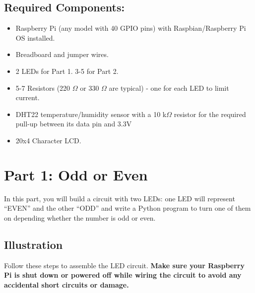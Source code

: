 \documentclass[a4paper,11pt]{article}
\begin{document}
\subsection*{Required Components:}
\begin{itemize}
    \item Raspberry Pi (any model with 40 GPIO pins) with Raspbian/Raspberry Pi OS installed. 
\item Breadboard and jumper wires.
\item 2 LEDs for Part 1. 3-5 for Part 2.
\item 5-7 Resistors (220 $\Omega$ or 330 $\Omega$ are typical) - one for each LED to limit current. 
\item DHT22 temperature/humidity sensor with a 10 k$\Omega$ resistor for the required pull-up between its data pin and 3.3V
\item 20x4 Character LCD.
\end{itemize}


\newpage
\section*{Part 1: Odd or Even}
In this part, you will build a circuit with two LEDs: one LED will represent “EVEN” and the other “ODD”
and write a 
Python program to turn one of them on depending whether the number is odd or even. 


\subsection*{Illustration}

Follow these steps to assemble the LED circuit. \textbf{Make sure your Raspberry Pi 
is shut down or powered off while wiring the circuit to avoid any accidental 
short circuits or damage.}
\end{document}
